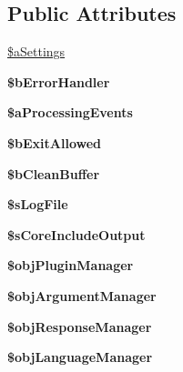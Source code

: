 \subsection*{Public Attributes}
\begin{DoxyCompactItemize}
\item 
\hyperlink{classxajax_ab1d2d962855dad08a56b21b63e62c632}{\$aSettings}
\item 
\hypertarget{classxajax_abc3abaec216dd8206a3faacb1a5d92aa}{
{\bfseries \$bErrorHandler}}
\label{classxajax_abc3abaec216dd8206a3faacb1a5d92aa}

\item 
\hypertarget{classxajax_a199f1dedbf8e69ff7bb43188efd225ea}{
{\bfseries \$aProcessingEvents}}
\label{classxajax_a199f1dedbf8e69ff7bb43188efd225ea}

\item 
\hypertarget{classxajax_afcd8ac5bdadadc7442c664ed7f1a5d32}{
{\bfseries \$bExitAllowed}}
\label{classxajax_afcd8ac5bdadadc7442c664ed7f1a5d32}

\item 
\hypertarget{classxajax_aa85e6f479e8e9e074073f1eca46c7877}{
{\bfseries \$bCleanBuffer}}
\label{classxajax_aa85e6f479e8e9e074073f1eca46c7877}

\item 
\hypertarget{classxajax_a344e927f725097e4749a992c8bd66bfc}{
{\bfseries \$sLogFile}}
\label{classxajax_a344e927f725097e4749a992c8bd66bfc}

\item 
\hypertarget{classxajax_aad9bfb465be3f208af35c441fe57488e}{
{\bfseries \$sCoreIncludeOutput}}
\label{classxajax_aad9bfb465be3f208af35c441fe57488e}

\item 
\hypertarget{classxajax_a096452470de3bc0b09d30c39aaed22ff}{
{\bfseries \$objPluginManager}}
\label{classxajax_a096452470de3bc0b09d30c39aaed22ff}

\item 
\hypertarget{classxajax_a7a30ecdf3443d98f70aab3e4a0ad033c}{
{\bfseries \$objArgumentManager}}
\label{classxajax_a7a30ecdf3443d98f70aab3e4a0ad033c}

\item 
\hypertarget{classxajax_a39ccdbf3b0a192bdd12a3138b3997193}{
{\bfseries \$objResponseManager}}
\label{classxajax_a39ccdbf3b0a192bdd12a3138b3997193}

\item 
\hypertarget{classxajax_a7e18ef8de55d9cf346868825a7616939}{
{\bfseries \$objLanguageManager}}
\label{classxajax_a7e18ef8de55d9cf346868825a7616939}

\end{DoxyCompactItemize}


